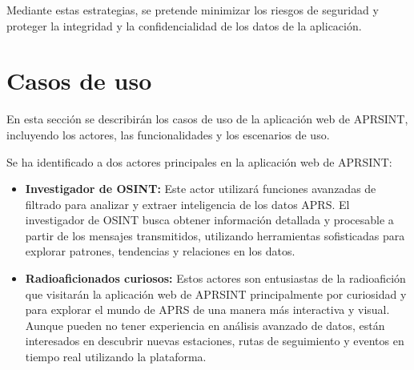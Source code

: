 Mediante estas estrategias, se pretende minimizar los riesgos de seguridad y proteger la integridad y la confidencialidad de los datos de la aplicación.

\section{Casos de uso}

En esta sección se describirán los casos de uso de la aplicación web de APRSINT, incluyendo los actores, las funcionalidades y los escenarios de uso.

Se ha identificado a dos actores principales en la aplicación web de APRSINT:
\begin{itemize}
	\item \textbf{Investigador de OSINT:} Este actor utilizará funciones avanzadas de filtrado para analizar y extraer inteligencia de los datos APRS. El investigador de OSINT busca obtener información detallada y procesable a partir de los mensajes transmitidos, utilizando herramientas sofisticadas para explorar patrones, tendencias y relaciones en los datos.
	\item \textbf{Radioaficionados curiosos:} Estos actores son entusiastas de la radioafición que visitarán la aplicación web de APRSINT principalmente por curiosidad y para explorar el mundo de APRS de una manera más interactiva y visual. Aunque pueden no tener experiencia en análisis avanzado de datos, están interesados en descubrir nuevas estaciones, rutas de seguimiento y eventos en tiempo real utilizando la plataforma.
\end{itemize}

